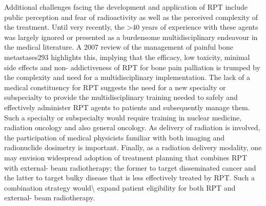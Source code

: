 \documentclass[
]{article}
\begin{document}
Additional challenges facing the development and application of RPT
include public perception and fear of radioactivity as well as the
perceived complexity of the treatment. Until very recently, the
\textgreater40 years of experience with these agents was largely ignored
or presented as a burdensome multidisciplinary endeavour in the medical
literature. A 2007 review of the management of painful bone
metastases293 highlights this, implying that the efficacy, low toxicity,
minimal side effects and non- addictiveness of RPT for bone pain
palliation is trumped by the complexity and need for a multidisciplinary
implementation. The lack of a medical constituency for RPT suggests the
need for a new specialty or subspecialty to provide the
multidisciplinary training needed to safely and effectively administer
RPT agents to patients and subsequently manage them. Such a specialty or
subspecialty would require training in nuclear medicine, radiation
oncology and also general oncology. As delivery of radiation is
involved, the participation of medical physicists familiar with both
imaging and radionuclide dosimetry is important. Finally, as a radiation
delivery modality, one may envision widespread adoption of treatment
planning that combines RPT with external- beam radiotherapy; the former
to target disseminated cancer and the latter to target bulky disease
that is less effectively treated by RPT. Such a combination strategy
would\textbackslash{} expand patient eligibility for both RPT and
external- beam radiotherapy.
\end{document}
